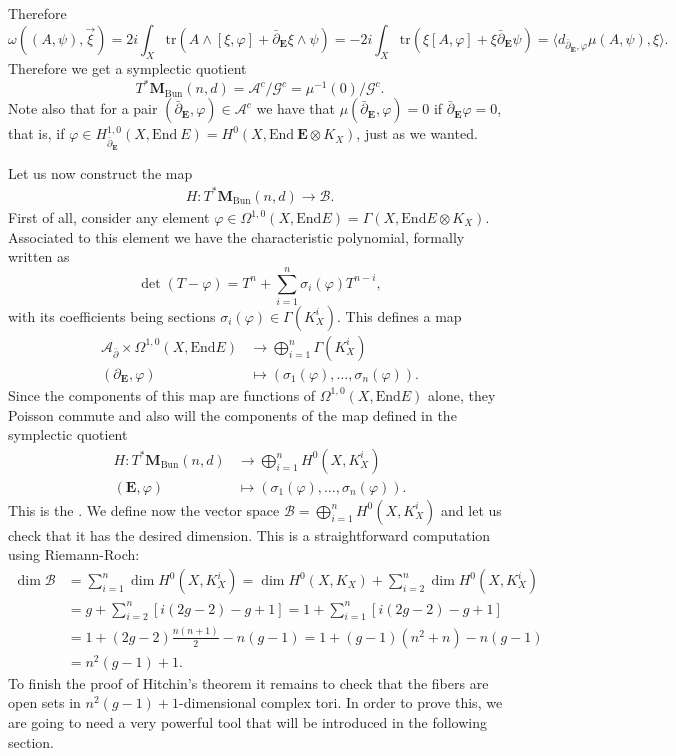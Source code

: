 \documentclass[12pt,a4paper]{book}
\theoremstyle{definition} \newtheorem{defn}[thm]{Definition}
\theoremstyle{definition} \newtheorem{ejemplo}[thm]{Example}
\theoremstyle{remark} \newtheorem{rem}[thm]{Remark}
\def\AA{\mathscr{A}}
\def\BB{\mathscr{B}}
\def\GG{\mathscr{G}}
\def\tr{\mathrm{tr}}
\def\End{\mathrm{End}}
\def\Bun{\mathbf{M}_{\mathrm{Bun}}}
\def\delbar{\bar{\partial}}
\newcommand{\ve}[1]{\mathbf{#1}}
\let\emph\relax
\begin{document}
  Therefore
  \begin{equation*}
    \omega\left( (A,\psi),\vec{\xi} \right)=2i\int_X \tr(A\wedge[\xi,\varphi] + \delbar_{\ve{E}} \xi \wedge \psi)=- 2i\int_X \tr(\xi[A,\varphi] + \xi \delbar_{\ve{E}} \psi)=\langle d_{\delbar_{\ve{E}},\varphi}\mu(A,\psi),\xi \rangle.
  \end{equation*}
  Therefore we get a symplectic quotient $$T^*\Bun(n,d)=\AA^{c}/\GG^c=\mu^{-1}(0)/\GG^c.$$   Note also that for a pair $(\delbar_{\ve{E}},\varphi)\in \AA^c$ we have that $\mu(\delbar_{\ve{E}},\varphi)=0$ if $\delbar_{\ve{E}} \varphi=0$, that is, if $\varphi\in H_{\delbar_{\ve{E}}}^{1,0}(X, \End\ E)=H^0(X,\End\ \ve{E} \otimes K_X)$, just as we wanted.

  Let us now construct the map 
  \begin{align*}
    H :T^*\Bun(n,d)\rightarrow \BB.
    \end{align*}
    First of all, consider any element $\varphi \in \Omega^{1,0}(X,\End E)=\Gamma(X,\End E \otimes K_X)$. Associated to this element we have the characteristic polynomial, formally written as
    \begin{equation*}
      \det(T-\varphi)=T^n + \sum_{i=1}^{n} \sigma_i(\varphi) T^{n-i},
    \end{equation*}
    with its coefficients being sections $\sigma_i(\varphi) \in \Gamma(K_X^i)$. This defines a map
    \begin{align*}
      \AA_{\delbar} \times \Omega^{1,0}(X,\End E)&\longrightarrow \bigoplus_{i=1}^n \Gamma(K_X^i)\\ 
      (\partial_{\ve{E}},\varphi) &\longmapsto (\sigma_1(\varphi),\dots,\sigma_n(\varphi)). 
      \end{align*}
      Since the components of this map are functions of $\Omega^{1,0}(X,\End E)$ alone, they Poisson commute and also will the components of the map defined in the symplectic quotient
      \begin{align*}
	H :T^*\Bun(n,d)&\longrightarrow \bigoplus_{i=1}^n H^0(X,K^i_X)\\ 
	(\ve{E},\varphi) &\longmapsto (\sigma_1(\varphi),\dots,\sigma_n(\varphi)). 
	\end{align*}
	This is the \emph{Hitchin map}. We define now the vector space $\BB= \bigoplus_{i=1}^n H^0(X,K^i_X)$ and let us check that it has the desired dimension. This is a straightforward computation using Riemann-Roch:
	\begin{align*}
      \dim \BB &= \sum_{i=1}^n \dim H^0(X,K_X^i)= \dim H^0(X,K_X) + \sum_{i=2}^n \dim H^0(X,K_X^i)\\
      &= g + \sum_{i=2}^n [i(2g-2)-g+1] =1+ \sum_{i=1}^n [i(2g-2)-g+1] \\
      &= 1+ (2g-2)\frac{n(n+1)}{2} - n(g-1) = 1+(g-1)(n^2+n) - n(g-1) \\
      &= n^2(g-1)+1.
    \end{align*}
    To finish the proof of Hitchin's theorem it remains to check that the fibers are open sets in $n^2(g-1)+1$-dimensional complex tori. In order to prove this, we are going to need a very powerful tool that will be introduced in the following section.
\end{document}
